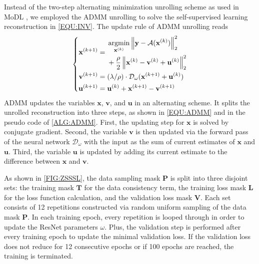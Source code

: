 \documentclass[AMA,STIX2COL,Linenumberson]{MRM}
\newcommand{\argmin}{\operatornamewithlimits{argmin}}
\newcommand{\norm}[1]{\left\lVert#1\right\rVert}
\begin{document}
Instead of the two-step alternating minimization unrolling scheme as used in MoDL
\cite{aggarwal_2018_modl},
we employed the ADMM unrolling
to solve the self-supervised learning reconstruction
in \cref{EQU:INV}. The update rule of ADMM unrolling reads
\begin{equation} \label{EQU:ADMM}
	\left\{\begin{aligned}
		\mathbf{x}^{(k+1)} &= \begin{split}&\argmin_{\mathbf{x}^{(k)}} \norm{\mathbf{y} - \mathcal{A}(\mathbf{x}^{(k)})}_2^2 \\&+ \frac{\rho}{2} \norm{ \mathbf{x}^{(k)} - \mathbf{v}^{(k)} + \mathbf{u}^{(k)}}_2^2\end{split} \\
		\mathbf{v}^{(k+1)} &= (\lambda/\rho) \cdot \mathcal{D}_{\omega} (\mathbf{x}^{(k+1)} + \mathbf{u}^{(k)}) \\
		\mathbf{u}^{(k+1)} &= \mathbf{u}^{(k)} + \mathbf{x}^{(k+1)} - \mathbf{v}^{(k+1)}
	\end{aligned}\right.
\end{equation}
ADMM updates the variables $\mathbf{x}$, $\mathbf{v}$,
and $\mathbf{u}$ in an alternating scheme.
It splits the unrolled reconstruction into three steps,
as shown in \cref{EQU:ADMM} and in the pseudo code of \cref{ALG:ADMM}.
First, the updating step for $\mathbf{x}$ is solved by conjugate gradient.
Second, the variable $\mathbf{v}$ is then updated
via the forward pass of the neural network $\mathcal{D}_{\omega}$
with the input as the sum of current estimates
of $\mathbf{x}$ and $\mathbf{u}$.
Third, the variable $\mathbf{u}$ is updated
by adding its current estimate to the difference
between $\mathbf{x}$ and $\mathbf{v}$.

As shown in \cref{FIG:ZSSSL}, 
the data sampling mask $\mathbf{P}$
is split into three disjoint sets:
the training mask $\mathbf{T}$ for the data consistency term,
the training loss mask $\mathbf{L}$ for the loss function calculation,
and the validation loss mask $\mathbf{V}$.
Each set consists of 12 repetitions constructed via random uniform sampling
of the data mask $\mathbf{P}$.
In each training epoch, every repetition is looped through
in order to update the ResNet parameters $\omega$.
Plus, the validation step is performed after every training epoch
to update the minimal validation loss.
If the validation loss does not reduce for 12 consecutive epochs or
if 100 epochs are reached, the training is terminated.
\end{document}
